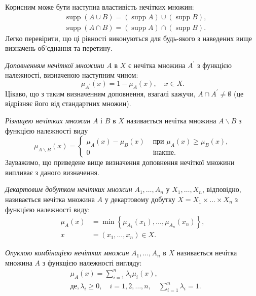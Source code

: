 \documentclass[14pt, a4paper, oneside]{extarticle}
\numberwithin{equation}{section}
\begin{document}
Корисним може бути наступна властивість нечітких множин:
\begin{equation}
\begin{aligned}
& \operatorname{supp}(A \cup B)=(\operatorname{supp} A) \cup(\operatorname{supp} B), \\
& \operatorname{supp}(A \cap B)=(\operatorname{supp} A) \cap(\operatorname{supp} B).
\end{aligned}
\end{equation}
Легко перевірити, що ці рівності виконуються для будь-якого з наведених вище визначень об'єднання та перетину.

\textit{Доповненням нечіткої множини} $A$ в $X$ є нечітка множина $A^{\prime}$ з функцією належності, визначеною наступним чином:
\begin{equation}
\mu_{A^{\prime}}(x)=1-\mu_A(x), \quad x \in X .
\end{equation}
Цікаво, що з таким визначенням доповнення, взагалі кажучи, $A \cap A^{\prime} \neq \emptyset$ (це відрізняє його від стандартних множин).

\textit{Різницею нечітких множин} $A$ і $B$ в $X$ називається нечітка множина $A \backslash B$ з функцією належності виду
\begin{equation}\mu_{A \backslash B}(x)=
\begin{cases}
\mu_A(x)-\mu_B(x) & \text { при } \mu_A(x) \geq \mu_B(x),\\
0 & \text { інакше. }
\end{cases}\end{equation}
Зауважимо, що приведене вище визначення доповнення нечіткої множини випливає з даного визначення.

\textit{Декартовим добутком нечітких множин} $A_1, \ldots, A_n$ у $X_1, \ldots, X_n$, відповідно, називається нечітка множина $A$ у декартовому добутку $X=X_1 \times \ldots \times X_n$ з функцією належності виду:
\begin{equation}
\begin{aligned}
\mu_A(x) & =\min \left\{\mu_{A_1}\left(x_1\right), \ldots, \mu_{A_n}\left(x_n\right)\right\}, \\
x & =\left(x_1, \ldots, x_n\right) \in X .
\end{aligned}
\end{equation}

\textit{Опуклою комбінацією нечітких множин} $A_1, \ldots, A_n$ в $X$ називається нечітка множина $A$ з функцією належності вигляду:
\begin{equation}
\begin{aligned}
& \mu_{A}(x)=\sum_{i=1}^n \lambda_i \mu_i(x), \\
& \text {де}, \lambda_i \geq 0, \quad i=1,2, \ldots, n, \quad\sum_{i=1}^n \lambda_i=1 .
\end{aligned}
\end{equation}
\end{document}
